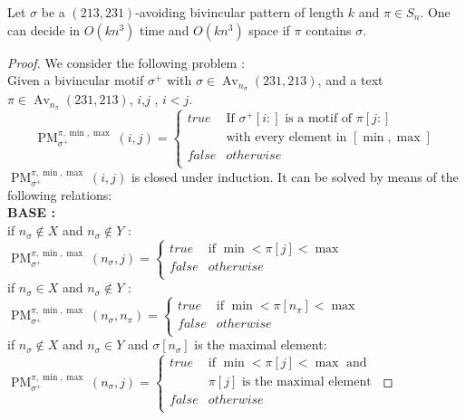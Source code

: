 \documentclass[a4paper]{llncs}
\DeclareMathOperator{\Avd}{Av}
\newcommand\Av[2]{\Avd_{{#1}}({#2})}
\newcommand{\ptext}{\pi}
\newcommand{\pmotif}{\sigma}
\newcommand{\x}{X}
\newcommand{\y}{Y}
\newcommand{\pbmotif}{\pmotif^+}
\DeclareMathOperator{\PMa}{PM}
\newcommand{\PM}[6]{\PMa_{{#1}}^{{#2},{#3},{#4}}({#5},{#6})}
\begin{document}
	\begin{proposition}
		\label{Proposition:bivincular pattern}
			Let $\sigma$ be a $(213,231)$-avoiding bivincular pattern of length $k$
			and $\pi \in S_n$.
			One can decide in $O(kn^3)$ time
			and $O(kn^3)$ space if $\pi$ contains $\sigma$.
	\end{proposition}


\begin{proof}
We consider the following problem :\\
Given a bivincular motif $\pbmotif$ with $\pmotif \in \Av{n_\pmotif}{231,213} $, and a text $\ptext \in \Av{n_\ptext}{231,213}$, $i$,$j$ , $i<j$.\\
$$
\PM{\pbmotif}{\ptext}{\min}{\max}{i}{j}=
\begin{cases}
	true 	& \text{If $\pbmotif[i:]$ is a motif of $\ptext[j:]$}\\
			  & \text{with every element in $[\min,\max]$}\\
	false 	& otherwise\\
\end{cases}
$$
$\PM{\pbmotif}{\ptext}{\min}{\max}{i}{j}$ is closed under induction.
It can be solved by means of the following relations:\\

\textbf{BASE :} \\
if $n_\pmotif \notin  \x $ and $n_\pmotif \notin  \y$ : \\
$
\PM{\pbmotif}{\ptext}{\min}{\max}{n_\pmotif}{j} =
\begin{cases}
	true 	& \text{if $\min<\ptext[j]<\max$}\\
	false 	& otherwise\\
\end{cases}
$
\\

if $n_\pmotif \in  \x $ and $n_\pmotif \notin  \y$ : \\
$
\PM{\pbmotif}{\ptext}{\min}{\max}{n_\pmotif}{n_\ptext} =
\begin{cases}
	true 	& \text{if $\min<\ptext[n_\ptext]<\max$}\\
	false 	& otherwise\\
\end{cases}
$
\\

if $n_\pmotif \notin  \x$  and $n_\pmotif \in  \y$ and $\pmotif[n_\pmotif]$ is the maximal element: \\
$
\PM{\pbmotif}{\ptext}{\min}{\max}{n_\pmotif}{j}=
\begin{cases}
	true 	& \text{if $\min<\ptext[j]<\max$ and }\\
			&\text{$\ptext[j]$ is the maximal element}\\
	false 	& otherwise\\
\end{cases}
$


\end{proof}
\end{document}
